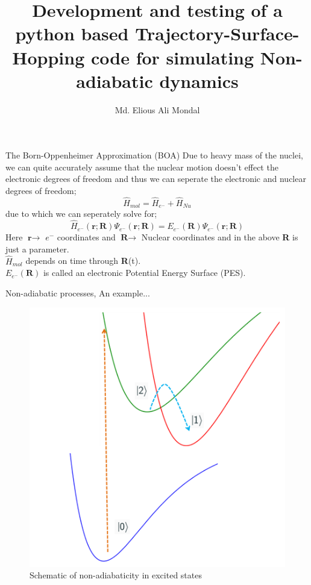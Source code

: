 \documentclass{beamer}
\title{Development and testing of a python based Trajectory-Surface-Hopping code for simulating Non-adiabatic dynamics}
\author{Md. Elious Ali Mondal}
\date{}
\begin{document}

	\begin{frame}
	\titlepage
	\end{frame}
	
	\begin{frame}[t]{The Born-Oppenheimer Approximation (BOA)}
	Due to heavy mass of the nuclei, we can quite accurately assume that the nuclear motion doesn't effect the electronic degrees of freedom and thus we can seperate the electronic and nuclear degrees of freedom;
	\begin{equation}
	\hat{H}_{mol} = \hat{H}_{e^-} + \hat{H}_{Nu}
	\end{equation}
	due to which we can seperately solve for;
	\begin{equation}
	\hat{H}_{e^-}(\textbf{r};\textbf{R})\Psi_{e^-}(\textbf{r};\textbf{R}) = E_{e^-}(\textbf{R})\Psi_{e^-}(\textbf{r};\textbf{R})
	\end{equation}
	Here $\textbf{r}\rightarrow$ $e^-$ coordinates and $\textbf{R}\rightarrow$ Nuclear coordinates and in the above \textbf{R} is just a parameter.\\ $\hat{H}_{mol}$ depends on time through \textbf{R}(t).\\ $E_{e^-}(\textbf{R})$ is called an electronic Potential Energy Surface (PES).
	\end{frame}	
	
	\begin{frame}[t]{Non-adiabatic processes, An example...}
	\begin{figure}
	\includegraphics[scale=0.55]{Elious-PES.png}
	\caption{Schematic of non-adiabaticity in excited states}
	\end{figure}
	\end{frame}
	
\end{document}
